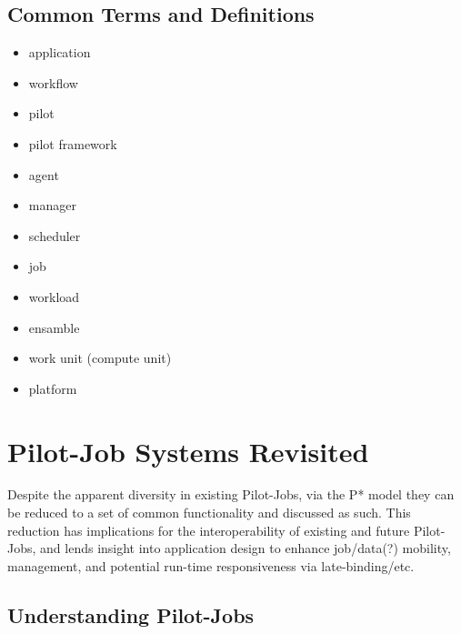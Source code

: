 \documentclass{sig-alternate}
\begin{document}
\subsection{Common Terms and Definitions}

\begin{itemize}
	\item application
	\item workflow
        \item pilot
        \item pilot framework
        \item agent
	\item manager
        \item scheduler
	\item job
        \item workload
	\item ensamble
        \item work unit (compute unit)
	\item platform
\end{itemize}

\section{Pilot-Job Systems Revisited}
Despite the apparent diversity in existing Pilot-Jobs, via the P*
model they can be reduced to a set of common functionality and
discussed as such.  This reduction has implications
for the interoperability of existing and future Pilot-Jobs, and
lends insight into application design to enhance job/data(?)
mobility, management, and potential run-time responsiveness via
late-binding/etc.
\subsection{Understanding Pilot-Jobs}
\end{document}
